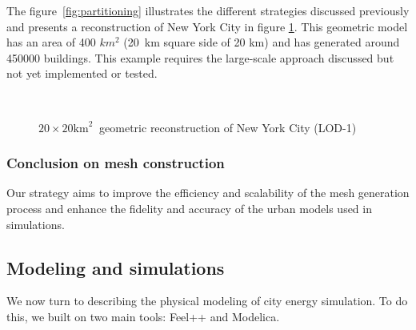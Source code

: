 \documentclass[runningheads]{llncs}
\begin{document}
The figure~\ref{fig:partitioning} illustrates the different strategies discussed previously and presents a reconstruction of New York City in figure \ref{fig:city-ny-largescale}. This geometric model has an area of 400 $km^2$ (20 km square side of 20 km) and has generated around 450000 buildings. This example requires the large-scale approach discussed but not yet implemented or tested. 

\begin{figure}[htbp]
\centering
{}
\hfill
{}\\
\hfill
{}
\caption{$20 \times 20 \mathrm{km}^2\ $ geometric reconstruction of New York City (LOD-1)}
\label{fig:city-ny-largescale}
\end{figure}


\subsubsection{Conclusion on mesh construction}
Our strategy aims to improve the efficiency and scalability of the mesh generation process and enhance the fidelity and accuracy of the urban models used in simulations.

\subsection{Modeling and simulations}

We now turn to describing the physical modeling of city energy simulation.
To do this, we built on two main tools: Feel++ and Modelica. 
\end{document}

